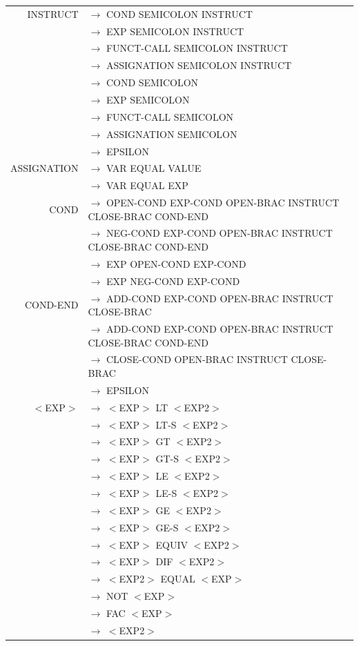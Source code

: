 \documentclass[a4paper,10pt]{article}
\begin{document}
\hspace{-4.5cm}\begin{tabular}{rl}


INSTRUCT			& $\rightarrow$ COND SEMICOLON INSTRUCT\\
					& $\rightarrow$ EXP SEMICOLON INSTRUCT\\
					& $\rightarrow$ FUNCT-CALL SEMICOLON INSTRUCT\\
					& $\rightarrow$ ASSIGNATION SEMICOLON INSTRUCT\\
					& $\rightarrow$ COND SEMICOLON \\
					& $\rightarrow$ EXP SEMICOLON \\
					& $\rightarrow$ FUNCT-CALL SEMICOLON \\
					& $\rightarrow$ ASSIGNATION SEMICOLON \\
					& $\rightarrow$ EPSILON \\
					

ASSIGNATION			& $\rightarrow$ VAR EQUAL VALUE \\
					& $\rightarrow$ VAR EQUAL EXP \\
					
COND				& $\rightarrow$ OPEN-COND EXP-COND OPEN-BRAC INSTRUCT CLOSE-BRAC COND-END\\
					& $\rightarrow$ NEG-COND EXP-COND OPEN-BRAC INSTRUCT CLOSE-BRAC COND-END\\
					& $\rightarrow$ EXP OPEN-COND EXP-COND \\
					& $\rightarrow$ EXP NEG-COND EXP-COND \\


COND-END			& $\rightarrow$ ADD-COND EXP-COND OPEN-BRAC INSTRUCT CLOSE-BRAC \\
					& $\rightarrow$ ADD-COND EXP-COND OPEN-BRAC INSTRUCT CLOSE-BRAC COND-END \\
					& $\rightarrow$ CLOSE-COND OPEN-BRAC INSTRUCT CLOSE-BRAC\\
					& $\rightarrow$ EPSILON \\					

$<$EXP$>$			& $\rightarrow$ $<$EXP$>$ LT $<$EXP2$>$\\
					& $\rightarrow$ $<$EXP$>$ LT-S $<$EXP2$>$\\
					& $\rightarrow$ $<$EXP$>$ GT $<$EXP2$>$\\
					& $\rightarrow$ $<$EXP$>$ GT-S $<$EXP2$>$\\
					& $\rightarrow$ $<$EXP$>$ LE $<$EXP2$>$\\
					& $\rightarrow$ $<$EXP$>$ LE-S $<$EXP2$>$\\
					& $\rightarrow$ $<$EXP$>$ GE $<$EXP2$>$\\
					& $\rightarrow$ $<$EXP$>$ GE-S $<$EXP2$>$\\
					& $\rightarrow$ $<$EXP$>$ EQUIV $<$EXP2$>$\\
					& $\rightarrow$ $<$EXP$>$ DIF $<$EXP2$>$\\
					& $\rightarrow$ $<$EXP2$>$ EQUAL $<$EXP$>$\\
					& $\rightarrow$ NOT $<$EXP$>$ \\
					& $\rightarrow$ FAC $<$EXP$>$ \\
					& $\rightarrow$ $<$EXP2$>$ \\
										

\end{tabular}
\end{document}
